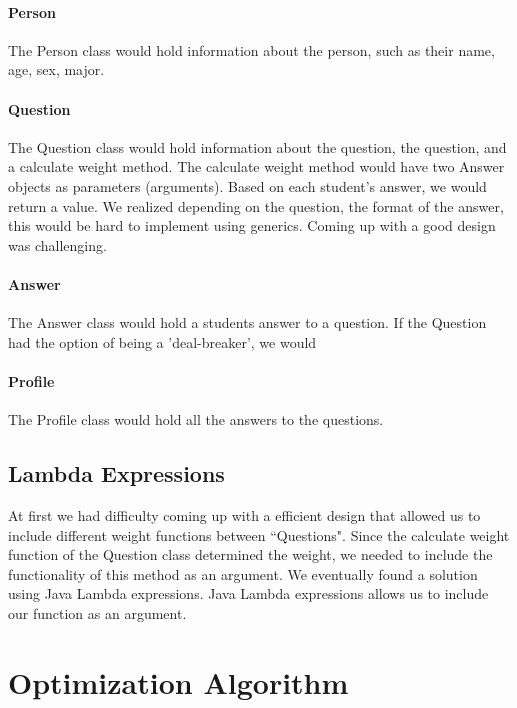 \documentclass[12pt]{article}
\begin{document}
\paragraph{Person} The Person class would hold information about the person, such as their name, age, sex, major. 
\paragraph{Question}
The Question class would hold information about the question, the question, and a calculate weight method. The calculate weight method would have two Answer objects as parameters (arguments). Based on each student's answer, we would return a value. We realized depending on the question, the format of the answer, this would be hard to implement using generics. Coming up with a good design was challenging. 

\paragraph{Answer} The Answer class would hold a students answer to a question. If the Question had the option of being a 'deal-breaker', we would
\paragraph{Profile} The Profile class would hold all the answers to the questions.  

\subsection{Lambda Expressions}
At first we had difficulty coming up with a efficient design that allowed us to include different weight functions between ``Questions". Since the calculate weight function of the Question class determined the weight, we needed to include the functionality of this method as an argument. We eventually found a solution using Java Lambda expressions. Java Lambda expressions allows us to include our function as an argument. 



\section{Optimization Algorithm}
\end{document}
